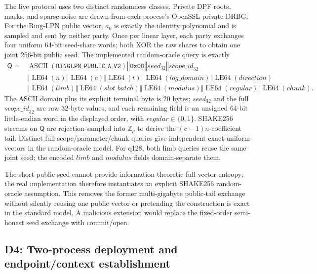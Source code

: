 \documentclass[11pt]{article}
\newcommand{\Z}{\mathbb{Z}}
\begin{document}
The live protocol uses two distinct randomness classes. Private DPF roots,
masks, and sparse noise are drawn from each process's OpenSSL private DRBG.
For the Ring-LPN public vector, $a_0$ is exactly the identity polynomial and is
sampled and sent by neither party. Once per linear layer, each party exchanges
four uniform 64-bit seed-share words; both XOR the raw shares to obtain one
joint 256-bit public seed. The implemented random-oracle query is exactly
\[
\begin{split}
\mathsf Q={}&
\operatorname{ASCII}(\texttt{RINGLPN\_PUBLIC\_A\_V2})
\mathbin\Vert \texttt{0x00}\mathbin\Vert \mathit{seed}_{32}
\mathbin\Vert \mathit{scope\_id}_{32}\\
&{}\mathbin\Vert \operatorname{LE64}(n)
\mathbin\Vert \operatorname{LE64}(c)
\mathbin\Vert \operatorname{LE64}(t)
\mathbin\Vert \operatorname{LE64}(\mathit{log\_domain})
\mathbin\Vert \operatorname{LE64}(\mathit{direction})\\
&{}\mathbin\Vert \operatorname{LE64}(\mathit{limb})
\mathbin\Vert \operatorname{LE64}(\mathit{slot\_batch})
\mathbin\Vert \operatorname{LE64}(\mathit{modulus})
\mathbin\Vert \operatorname{LE64}(\mathit{regular})
\mathbin\Vert \operatorname{LE64}(\mathit{chunk}).
\end{split}
\]
The ASCII domain plus its explicit terminal byte is 20 bytes;
$\mathit{seed}_{32}$ and the full $\mathit{scope\_id}_{32}$ are raw 32-byte
values, and each remaining field is an unsigned 64-bit little-endian word in the displayed
order, with $\mathit{regular}\in\{0,1\}$. SHAKE256 streams on $\mathsf Q$ are
rejection-sampled into $\Z_p$ to
derive the $(c-1)n$-coefficient tail. Distinct full scope/parameter/chunk
queries give independent exact-uniform vectors in the random-oracle model.
For q128, both limb queries reuse the same joint seed; the encoded
$\mathit{limb}$ and $\mathit{modulus}$ fields domain-separate them.

The short public seed cannot provide information-theoretic full-vector entropy;
the real implementation therefore instantiates an explicit SHAKE256
random-oracle assumption. This removes the former multi-gigabyte public-tail
exchange without silently reusing one public vector or pretending the
construction is exact in the standard model. A malicious extension would
replace the fixed-order semi-honest seed exchange with commit/open.

\subsection{D4: Two-process deployment and endpoint/context establishment}
\label{sec:design-deploy}
\end{document}
